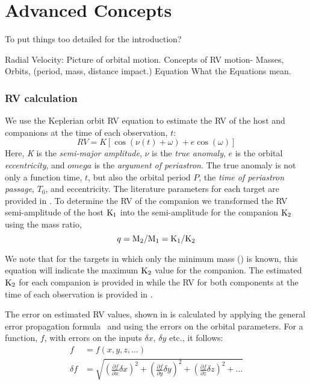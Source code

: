 
\chapter{Advanced Concepts}
\label{cha:concepts}
To put things too detailed for the introduction?


Radial Velocity:
Picture of orbital motion.
Concepts of {RV} motion-
Masses,
Orbits, (period, mass, distance impact.)
Equation
What the Equations mean.

\subsection{{RV} calculation}
We use the Keplerian orbit {RV} equation to estimate the {RV} of the host and companions at the time of each observation, \(t\):
\begin{equation}
\label{eq:rv_equation}
{RV} = K [\cos{(\nu(t) + \omega)} + e\cos{(\omega)}]
\end{equation}
Here, \emph{K} is the \emph{semi-major amplitude}, \(\nu\) is the \emph{true anomaly}, \(e\) is the orbital \emph{eccentricity}, and \(omega\) is the \emph{argument of periastron}.
The true anomaly is not only a function time, \(t\), but also the orbital period \(P\), the \emph{time of periastron passage}, \(T_0\), and eccentricity.
The literature parameters for each target are provided in .
To determine the {RV} of the companion we transformed the {RV} semi-amplitude of the host \(\textrm{K}_{1}\) into the semi-amplitude for the companion \(\textrm{K}_{2}\) using the mass ratio,
\begin{equation}
\label{eqn:mass_ratio}
q = \textrm{M}_{2} / \textrm{M}_{1} = \textrm{K}_{1} / \textrm{K}_{2}
\end{equation}

We note that for the targets in which only the minimum mass (\mtwosini) is known, this equation will indicate the maximum \(\textrm{K}_{2}\) value for the companion. The estimated \(\textrm{K}_{2}\) for each companion is provided in  while the {RV} for both components at the time of each observation is provided in .

The error on estimated {RV} values, shown in  is calculated by applying the general error propagation formula~\citep{ku_notes_1966} and using the  errors on the orbital parameters. For a function, \(f\), with errors on the inputs \(\delta x\), \(\delta y\) etc., it follows:
\begin{align}
f &= f(x, y, z, \ldots)\\
\delta f &= \sqrt{{\left( \frac{\partial f}{\partial x} \delta x\right)}^2 + {\left(\frac{\partial f}{\partial y} \delta y\right)}^2 + {\left(\frac{\partial f}{\partial z} \delta z\right)}^2 + \ldots}
\end{align}




